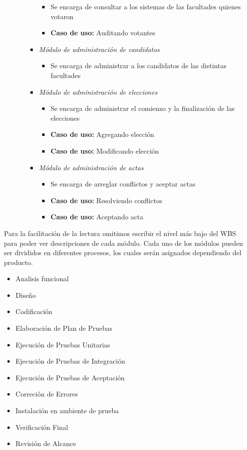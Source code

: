 \begin{itemize}
\begin{itemize}
\begin{itemize}
\begin{itemize}
 \item Se encarga de consultar a los sistemas de las facultades quienes votaron
 \item {\bf Caso de uso:} Auditando votantes
\end{itemize}
 \item \emph{M\'odulo de administración de candidatos}
\begin{itemize}
 \item Se encarga de administrar a los candidatos de las distintas facultades
\end{itemize}
 \item \emph{M\'odulo de administración de elecciones}
\begin{itemize}
 \item Se encarga de administrar el comienzo y la finalización de las elecciones
 \item {\bf Caso de uso:} Agregando elección
 \item {\bf Caso de uso:} Modificando elección
\end{itemize}
 \item \emph{M\'odulo de administración de actas}
\begin{itemize}
 \item Se encarga de arreglar conflictos y aceptar actas
 \item {\bf Caso de uso:} Resolviendo conflictos
 \item {\bf Caso de uso:} Aceptando acta
\end{itemize}
\end{itemize}
\end{itemize}
\end{itemize}


Para la facilitación de la lectura omitimos escribir el nivel más bajo del WBS para poder ver descripciones de cada m\'odulo. Cada uno de los m\'odulos pueden ser divididos en diferentes procesos,
los cuales serán asignados dependiendo del producto.
\begin{itemize}
 \item Analisis funcional
 \item Diseño
 \item Codificación
 \item Elaboración de Plan de Pruebas
 \item Ejecución de Pruebas Unitarias
 \item Ejecución de Pruebas de Integración
 \item Ejecución de Pruebas de Aceptación
 \item Correción de Errores
 \item Instalación en ambiente de prueba
 \item Verificación Final
 \item Revisión de Alcance
\end{itemize}	
